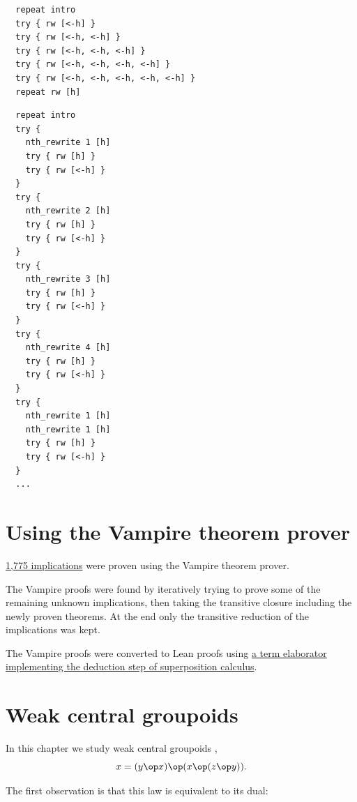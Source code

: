 \begin{verbatim}
  repeat intro
  try { rw [<-h] }
  try { rw [<-h, <-h] }
  try { rw [<-h, <-h, <-h] }
  try { rw [<-h, <-h, <-h, <-h] }
  try { rw [<-h, <-h, <-h, <-h, <-h] }
  repeat rw [h]
\end{verbatim}

\begin{verbatim}
  repeat intro
  try {
    nth_rewrite 1 [h]
    try { rw [h] }
    try { rw [<-h] }
  }
  try {
    nth_rewrite 2 [h]
    try { rw [h] }
    try { rw [<-h] }
  }
  try {
    nth_rewrite 3 [h]
    try { rw [h] }
    try { rw [<-h] }
  }
  try {
    nth_rewrite 4 [h]
    try { rw [h] }
    try { rw [<-h] }
  }
  try {
    nth_rewrite 1 [h]
    nth_rewrite 1 [h]
    try { rw [h] }
    try { rw [<-h] }
  }
  ...
\end{verbatim}


\chapter{Using the Vampire theorem prover}\label{vampire-chapter}

\href{https://github.com/teorth/equational_theories/tree/main/equational_theories/Generated/VampireProven/}
{1,775 implications} were proven using the Vampire theorem prover.

The Vampire proofs were found by iteratively trying to prove some of the remaining unknown implications,
then taking the transitive closure including the newly proven theorems. At the end only the transitive
reduction of the implications was kept.

The Vampire proofs were converted to Lean proofs using
\href{https://github.com/teorth/equational_theories/tree/main/equational_theories/Superposition.lean}
{a term elaborator implementing the deduction step of superposition calculus}.


\chapter{Weak central groupoids}\label{weak-central-groupoids-chapter}
In this chapter we study weak central groupoids ,
\begin{equation}\label{1485}
  x = (y \op x) \op (x \op (z \op y)).
\end{equation}

The first observation is that this law is equivalent to its dual:

